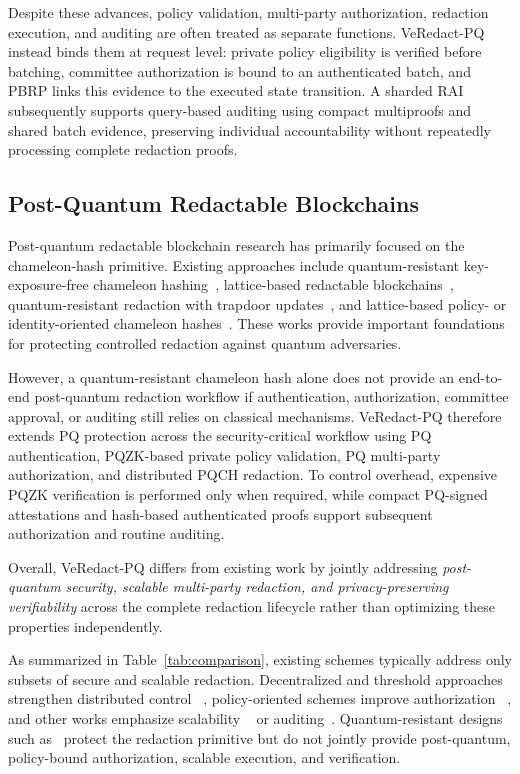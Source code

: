 \documentclass[lettersize,journal]{IEEEtran}
\begin{document}
    Despite these advances, policy validation, multi-party authorization,
    redaction execution, and auditing are often treated as separate
    functions. VeRedact-PQ instead binds them at request level: private
    policy eligibility is verified before batching, committee authorization
    is bound to an authenticated batch, and PBRP links this evidence to the
    executed state transition. A sharded RAI subsequently supports
    query-based auditing using compact multiproofs and shared batch
    evidence, preserving individual accountability without repeatedly
    processing complete redaction proofs.
    
    \subsection{Post-Quantum Redactable Blockchains}
    
    Post-quantum redactable blockchain research has primarily focused on
    the chameleon-hash primitive. Existing approaches include
    quantum-resistant key-exposure-free chameleon hashing~\cite{ref11},
    lattice-based redactable blockchains~\cite{ref10}, quantum-resistant
    redaction with trapdoor updates~\cite{ref17}, and lattice-based policy-
    or identity-oriented chameleon hashes~\cite{ref18,ref37}. These works
    provide important foundations for protecting controlled redaction
    against quantum adversaries.
    
    However, a quantum-resistant chameleon hash alone does not provide an
    end-to-end post-quantum redaction workflow if authentication,
    authorization, committee approval, or auditing still relies on
    classical mechanisms. VeRedact-PQ therefore extends PQ protection
    across the security-critical workflow using PQ authentication,
    PQZK-based private policy validation, PQ multi-party authorization, and
    distributed PQCH redaction. To control overhead, expensive PQZK
    verification is performed only when required, while compact PQ-signed
    attestations and hash-based authenticated proofs support subsequent
    authorization and routine auditing.
    
    Overall, VeRedact-PQ differs from existing work by jointly addressing
    \emph{post-quantum security, scalable multi-party redaction, and
    privacy-preserving verifiability} across the complete redaction
    lifecycle rather than optimizing these properties independently.
    

As summarized in Table~\ref{tab:comparison}, existing schemes typically
address only subsets of secure and scalable redaction. Decentralized
and threshold approaches strengthen distributed control
~\cite{ref1,ref15,ref27}, policy-oriented schemes improve authorization
~\cite{ref5,ref34}, and other works emphasize scalability
~\cite{ref14,ref20} or auditing~\cite{ref13,ref33}. Quantum-resistant
designs such as~\cite{ref17} protect the redaction primitive but do not
jointly provide post-quantum, policy-bound authorization, scalable
execution, and verification.
\end{document}

